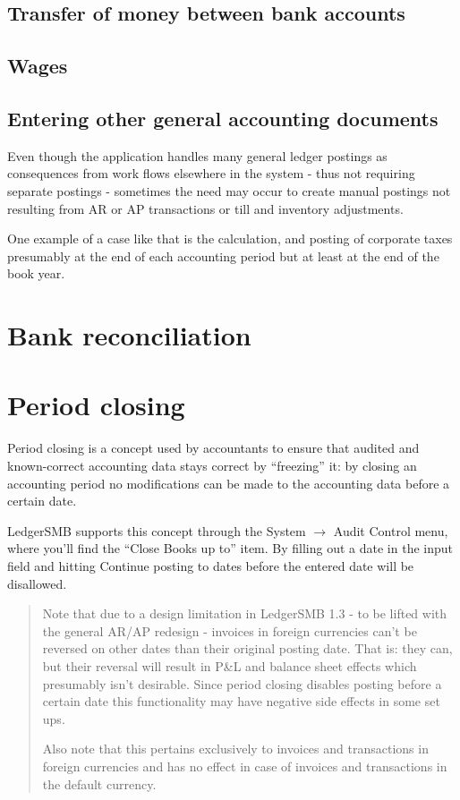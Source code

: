 \subsection{Transfer of money between bank accounts}
\subsection{Wages}

\subsection{Entering other general accounting documents}

Even though the application handles many general ledger postings as consequences
from work flows elsewhere in the system - thus not requiring separate postings -
sometimes the need may occur to create manual postings not resulting from
AR or AP transactions or till and inventory adjustments.

One example of a case like that is the calculation, and posting of
corporate taxes presumably at the end of each accounting period but at least
at the end of the book year.



\section{Bank reconciliation}
\label{sec:Reconciliation}



\section{Period closing}

Period closing is a concept used by accountants to ensure that audited and
known-correct accounting data stays correct by ``freezing'' it: by closing
an accounting period no modifications can be made to the accounting data
before a certain date.

LedgerSMB supports this concept through the System $\rightarrow$ Audit Control
menu, where you'll find the ``Close Books up to'' item. By filling out a date
in the input field and hitting Continue posting to dates before the entered
date will be disallowed.


\begin{quotation}
Note that due to a design limitation in LedgerSMB 1.3 - to be lifted with the
general AR/AP redesign - invoices in foreign currencies can't be reversed on
other dates than their original posting date. That is: they can, but their
reversal will result in P\&L and balance sheet effects which presumably isn't
desirable. Since period closing disables posting before a certain date this
functionality may have negative side effects in some set ups.

Also note that this pertains exclusively to invoices and transactions in foreign
currencies and has no effect in case of invoices and transactions in the default
currency.
\end{quotation}

